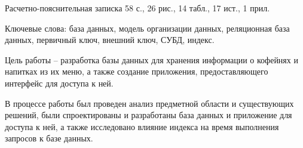 
Расчетно-пояснительная записка 58 с., 26 рис., 14 табл., 17 ист., 1 прил.

Ключевые слова: база данных, модель организации данных, реляционная база данных, первичный ключ, внешний ключ, СУБД, индекс.

Цель работы -- разработка базы данных для хранения информации о кофейнях и напитках из их меню, а также создание приложения, предоставляющего интерфейс для доступа к ней.

В процессе работы был проведен анализ предметной области и существующих решений, были спроектированы и разработаны база данных и приложение для доступа к ней, а также исследовано влияние индекса на время выполнения запросов к базе данных.

\setcounter{page}{4} 

\newpage
{} %
\renewcommand{\contentsname}{
	\vspace{-31mm}
	\begin{center}
	\large\bfseries{СОДЕРЖАНИЕ}
	\end{center}
	\vspace{-20mm}
}
\setcounter{page}{5} 
\tableofcontents
\newpage
 